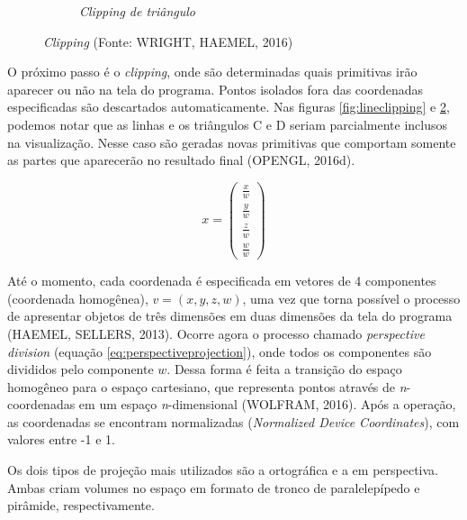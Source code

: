 \begin{figure}[H]
\begin{subfigure}[b]{0.4\textwidth}
		\caption{\textit{Clipping de triângulo} }
		\label{fig:triangleclipping}
	\end{subfigure}
	\caption{\textit{Clipping} (Fonte: WRIGHT, HAEMEL, 2016)}
\end{figure}
	
O próximo passo é o \textit{clipping}, onde são determinadas quais primitivas irão aparecer ou não na tela do programa. Pontos isolados fora das coordenadas especificadas são descartados automaticamente. Nas figuras \ref{fig:lineclipping} e \ref{fig:triangleclipping}, podemos notar que as linhas e os triângulos C e D seriam parcialmente inclusos na visualização. Nesse caso são geradas novas primitivas que comportam somente as partes que aparecerão no resultado final (OPENGL, 2016d).

\begin{equation}
x = 
\begin{pmatrix} 
\frac{x}{w} \\
\frac{y}{w} \\
\frac{z}{w} \\
\frac{w}{w}
\end{pmatrix}
\label{eq:perspectiveprojection}
\end{equation}

Até o momento, cada coordenada é especificada em vetores de 4 componentes (coordenada homogênea), $v = (x, y, z, w)$, uma vez que torna possível o processo de apresentar objetos de três dimensões em duas dimensões da tela do programa (HAEMEL, SELLERS, 2013). Ocorre agora o processo chamado \textit{perspective division} (equação \ref{eq:perspectiveprojection}), onde todos os componentes são divididos pelo componente $w$. Dessa forma é feita a transição do espaço homogêneo para o espaço cartesiano, que representa pontos através de \textit{n}-coordenadas em um espaço \textit{n}-dimensional (WOLFRAM, 2016). Após a operação, as coordenadas se encontram normalizadas (\textit{Normalized Device Coordinates}), com valores entre -1 e 1.


Os dois tipos de projeção mais utilizados são a ortográfica e a em perspectiva. Ambas criam volumes no espaço em formato de tronco de paralelepípedo e pirâmide, respectivamente. 

